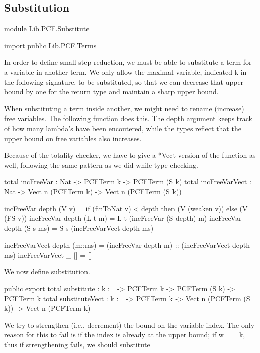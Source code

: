 \subsection{Substitution}

\begin{hidden}
module Lib.PCF.Substitute

import public Lib.PCF.Terms
\end{hidden}

In order to define small-step reduction, we must be able to substitute a term
for a variable in another term.
We only allow the maximal variable, indicated k in the following signature, to be substituted,
so that we can decrease that upper bound by one for the return type and maintain a sharp upper bound.

When substituting a term inside another, we might need to rename (increase)
free variables. The following function does this.
The depth argument keeps track of how many lambda's have been encoutered,
while the types reflect that the upper bound on free variables also increases.

Because of the totality checker, we have to give a *Vect version of the function as well, following
the same pattern as we did while type checking.

\begin{code}
total incFreeVar : Nat -> PCFTerm k -> PCFTerm (S k)
total incFreeVarVect : Nat -> Vect n (PCFTerm k) -> Vect n (PCFTerm (S k))

incFreeVar depth (V v)    = if (finToNat v) < depth
                              then (V (weaken v))
                            else (V (FS v))
incFreeVar depth (L t m)  = L t (incFreeVar (S depth) m)
incFreeVar depth (S s ms) = S s (incFreeVarVect depth ms)

incFreeVarVect depth (m::ms) = (incFreeVar depth m) :: (incFreeVarVect depth ms)
incFreeVarVect _     []      = []
\end{code}

We now define substitution.

\begin{code}
public export
total substitute : {k :_} -> PCFTerm k -> PCFTerm (S k) -> PCFTerm k
total substituteVect : {k :_} -> PCFTerm k -> Vect n (PCFTerm (S k)) -> Vect n (PCFTerm k)
\end{code}

We try to strengthen (i.e., decrement) the bound on the variable index.
The only reason for this to fail is if the index is already at the upper bound; if w == k, thus
if strengthening fails, we should substitute

